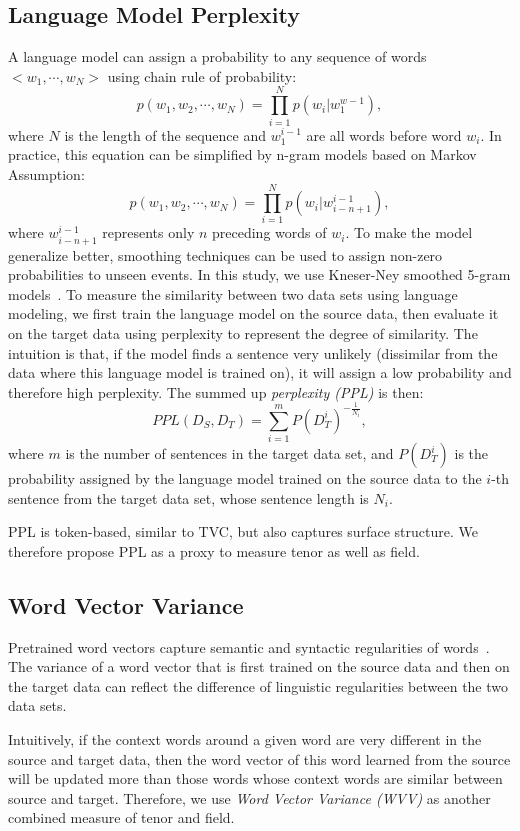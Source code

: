 \documentclass[11pt,a4paper]{article}
\begin{document}
\subsection{Language Model Perplexity}
A language model can assign a probability to any sequence of words $<w_1,\cdots,w_N>$ using chain rule of probability:
\[
p(w_1, w_2, \cdots, w_N) = \prod_{i=1}^N p(w_i|w_1^{w-1}),
\]
where $N$ is the length of the sequence and $w_1^{i-1}$ are all words before word $w_i$.
In practice, this equation can be simplified by n-gram models based on Markov Assumption:
\[
p(w_1, w_2, \cdots, w_N) = \prod_{i=1}^N p(w_i|w_{i-n+1}^{i-1}),
\]
where $w_{i-n+1}^{i-1}$ represents only $n$ preceding words of $w_i$.
To make the model generalize better, smoothing techniques can be used to assign non-zero probabilities to unseen events. 
In this study, we use Kneser-Ney smoothed 5-gram models~\citep{Heafield:SMT:2011}. 
To measure the similarity between two data sets using language modeling, we first train the language model on the source data, then evaluate it on the target data using perplexity to represent the degree of similarity. 
The intuition is that, if the model finds a sentence very unlikely (dissimilar from the data where this language model is trained on), it will assign a low probability and therefore high perplexity. 
The summed up \emph{perplexity (PPL)} is then:
\[
PPL(D_S, D_T) = \sum_{i=1}^{m} P(D_T^i)^{-\frac{1}{N_i}},
\]
where $m$ is the number of sentences in the target data set, and $P(D_T^i)$ is the probability assigned by the language model trained on the source data to the $i$-th sentence from the target data set, whose sentence length is $N_i$.

PPL is token-based, similar to TVC, but also captures surface structure. 
We therefore propose PPL as a proxy to measure tenor as well as field.

\subsection{Word Vector Variance}
Pretrained word vectors capture semantic and syntactic regularities of words~\citep{Artetxe:Labaka:CONLL:2018}. 
The variance of a word vector that is first trained on the source data and then on the target data can reflect the difference of linguistic regularities between the two data sets. 

Intuitively, if the context words around a given word are very different in the source and target data, then the word vector of this word learned from the source will be updated more than those words whose context words are similar between source and target. 
Therefore, we use \emph{Word Vector Variance (WVV)} as another combined measure of tenor and field.
 
\end{document}
